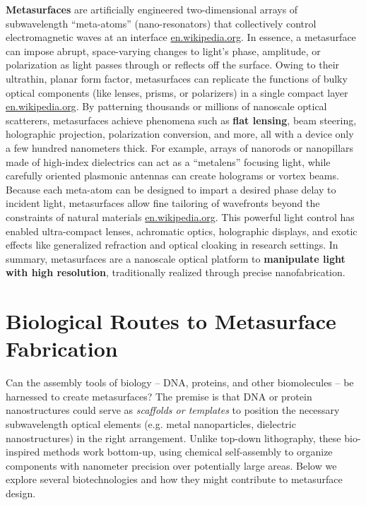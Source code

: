 \documentclass[11pt,a4paper]{article}
\begin{document}
\textbf{Metasurfaces} are artificially engineered two-dimensional arrays of subwavelength ``meta-atoms'' (nano-resonators) that collectively control electromagnetic waves at an interface \href{https://en.wikipedia.org/wiki/Electromagnetic_metasurface#:~:text=A metasurface is generally defined,2}{en.wikipedia.org}. In essence, a metasurface can impose abrupt, space-varying changes to light's phase, amplitude, or polarization as light passes through or reflects off the surface. Owing to their ultrathin, planar form factor, metasurfaces can replicate the functions of bulky optical components (like lenses, prisms, or polarizers) in a single compact layer \href{https://en.wikipedia.org/wiki/Electromagnetic_metasurface#:~:text=unusual properties through three,2}{en.wikipedia.org}. By patterning thousands or millions of nanoscale optical scatterers, metasurfaces achieve phenomena such as \textbf{flat lensing}, beam steering, holographic projection, polarization conversion, and more, all with a device only a few hundred nanometers thick. For example, arrays of nanorods or nanopillars made of high-index dielectrics can act as a ``metalens'' focusing light, while carefully oriented plasmonic antennas can create holograms or vortex beams. Because each meta-atom can be designed to impart a desired phase delay to incident light, metasurfaces allow fine tailoring of wavefronts beyond the constraints of natural materials \href{https://en.wikipedia.org/wiki/Electromagnetic_metasurface#:~:text=A metasurface is generally defined,2}{en.wikipedia.org}. This powerful light control has enabled ultra-compact lenses, achromatic optics, holographic displays, and exotic effects like generalized refraction and optical cloaking in research settings. In summary, metasurfaces are a nanoscale optical platform to \textbf{manipulate light with high resolution}, traditionally realized through precise nanofabrication.

\section{Biological Routes to Metasurface Fabrication}

Can the assembly tools of biology -- DNA, proteins, and other biomolecules -- be harnessed to create metasurfaces? The premise is that DNA or protein nanostructures could serve as \emph{scaffolds or templates} to position the necessary subwavelength optical elements (e.g. metal nanoparticles, dielectric nanostructures) in the right arrangement. Unlike top-down lithography, these bio-inspired methods work bottom-up, using chemical self-assembly to organize components with nanometer precision over potentially large areas. Below we explore several biotechnologies and how they might contribute to metasurface design.
\end{document}
